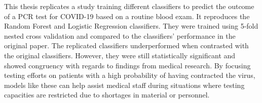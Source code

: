 This thesis replicates a study training different classifiers to predict the 
outcome of a PCR test for COVID-19 based on a routine blood exam. It 
reproduces the Random Forest and Logistic Regression classifiers. They were 
trained using 5-fold nested cross validation and compared to the classifiers' 
performance in the original paper. The replicated classifiers underperformed 
when contrasted with the original classifiers. However, they were still 
statistically significant and showed congruency with regards to findings from 
medical research. By focusing testing efforts on patients with a high 
probability of having contracted the virus, models like these can help assist 
medical staff during situations where testing capacities are restricted due to 
shortages in material or personnel.
